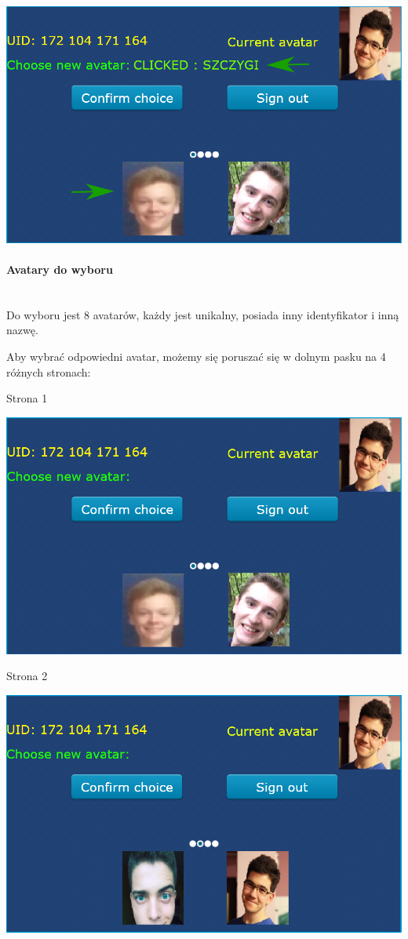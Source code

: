 \documentclass[12pt,hidelinks]{article}
\newcommand{\subsubsubsection}[1]{\paragraph{#1}\mbox{}\\}
\begin{document}
    \begin{center}
        \includegraphics[scale=0.6]{img/screen2-highlighted-avatar-clicked.png}
    \end{center}

    \newpage

    \subsubsubsection{Avatary do wyboru}
    Do wyboru jest 8 avatarów, każdy jest unikalny, posiada inny identyfikator i inną nazwę.

    Aby wybrać odpowiedni avatar, możemy się poruszać się w dolnym pasku na 4 różnych stronach:

    Strona 1
    \begin{center}
        \includegraphics[scale=0.75]{img/screen2-page1.png}
    \end{center}

    Strona 2
    \begin{center}
        \includegraphics[scale=0.75]{img/screen2-page2.png}
    \end{center}
\end{document}

